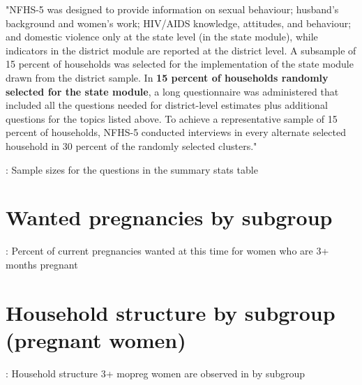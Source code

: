 \documentclass{article}
\begin{document}
"NFHS-5 was designed to provide information on sexual behaviour; husband’s background and women’s work;
HIV/AIDS knowledge, attitudes, and behaviour; and domestic violence only at the state level (in the state module), while indicators in the district module are reported at the district level. A subsample of 15 percent of households was
selected for the implementation of the state module drawn from the district sample. In \textbf{15 percent of households randomly selected for the state module}, a long questionnaire was administered that included all the questions needed for district-level estimates plus additional questions for the topics listed above. To achieve a representative sample of 15 percent of households, NFHS-5 conducted interviews in every alternate selected household in 30 percent of the
randomly selected clusters."

\begin{table}[H]
    \centering
    \setlength{\tabcolsep}{4pt} %
    \footnotesize %
    \caption{: Sample sizes for the questions in the summary stats table}
    \label{tab:sumstat}
    \begin{adjustbox}{width=\textwidth}
        
    \end{adjustbox}
\end{table}

\section{Wanted pregnancies by subgroup}

\begin{table}[H]
    \centering
    \setlength{\tabcolsep}{4pt} %
    \footnotesize %
    \caption{: Percent of current pregnancies wanted at this time for women who are 3+ months pregnant}
    \label{tab:sumstat}
    \begin{adjustbox}{width=\textwidth}
        
    \end{adjustbox}
\end{table}

\section{Household structure by subgroup (pregnant women)}

\begin{table}[H]
    \centering
    \setlength{\tabcolsep}{4pt} %
    \footnotesize %
    \caption{: Household structure 3+ mopreg women are observed in by subgroup}
    \label{tab:sumstat}
    \begin{adjustbox}{width=\textwidth}
        
    \end{adjustbox}
\end{table}
\end{document}
